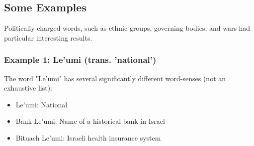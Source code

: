 \documentclass[10pt, a4paper]{article}
\begin{document}
\subsection{Some Examples}
Politically charged words, such as ethnic groups, governing bodies, and wars had particular interesting results. 
\subsubsection{Example 1: Le'umi (trans. 'national')}
The word "Le'umi" has several significantly different word-senses (not an exhaustive list):
\begin{itemize}
    \item Le'umi: National
    \item Bank Le'umi: Name of a historical bank in Israel
    \item Bituach Le'umi: Israeli health insurance system
\end{itemize}
\end{document}
